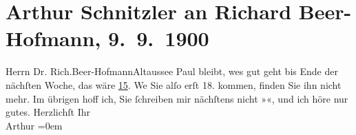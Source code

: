 

         
         \renewcommand{\erwaehntePersonen}{Personen: Richard Beer-Hofmann, Paul Goldmann}
         \renewcommand{\erwaehnteOrte}{Orte: Altaussee, I., Innere Stadt, Wien}
         \renewcommand{\erwaehnteWerke}{}
               \section[Arthur Schnitzler an Richard Beer-Hofmann, 9. 9. 1900]{ Arthur Schnitzler an Richard Beer-Hofmann, 9. 9. 1900}\nopagebreak{}\rehead{ }\begin{ledgroupsized}[t]{13cm}\normalsize\beginnumbering{} \toendnotes[C]{\smallbreak\pagebreak[2]} 
\toendnotes[C]{\smallbreak}\pstart{}{\pb}Herrn Dr. Rich.\pend{}\pstart{}Beer-Hofmann\pend{}\pstart{}Altaussee\pend{}{\bigskip}\pstart
           \noindent{}{\pb}Paul bleibt, we{\geminationn}s
               gut geht bis Ende der nächſten Woche, das wäre \uline{15}. We{\geminationn} Sie alſo erſt 18. kommen, finden
               Sie ihn nicht mehr. Im übrigen hoff ich, Sie ſchreiben mir nächſtens nicht »\label{K_L01072-1v}\label{K_L01072-1h}«, und ich höre nur gutes.\pend
           \pstart
           Herzlichſt Ihr{\\[\baselineskip]}\spacefill\mbox{Arthur}\pend
           \leftskip=0em{}
         
         \endnumbering{}\end{ledgroupsized}  \newcommand{\dateiname}{L01072}\newcommand{\titel}{Arthur Schnitzler an Richard Beer-Hofmann, 9. 9. 1900}\newcommand{\editorInnen}{Martin Anton Müller und Gerd-Hermann Susen}
      